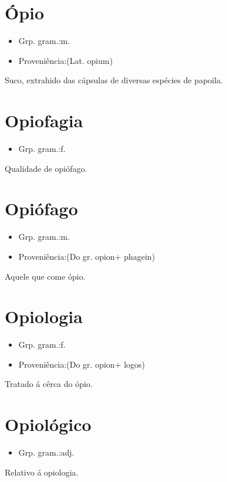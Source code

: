 \section{Ópio}
\begin{itemize}
\item {Grp. gram.:m.}
\end{itemize}
\begin{itemize}
\item {Proveniência:(Lat. \textunderscore opium\textunderscore )}
\end{itemize}
Suco, extrahido das cápsulas de diversas espécies de papoila.
\section{Opiofagia}
\begin{itemize}
\item {Grp. gram.:f.}
\end{itemize}
Qualidade de opiófago.
\section{Opiófago}
\begin{itemize}
\item {Grp. gram.:m.}
\end{itemize}
\begin{itemize}
\item {Proveniência:(Do gr. \textunderscore opion\textunderscore  + \textunderscore phagein\textunderscore )}
\end{itemize}
Aquele que come ópio.
\section{Opiologia}
\begin{itemize}
\item {Grp. gram.:f.}
\end{itemize}
\begin{itemize}
\item {Proveniência:(Do gr. \textunderscore opion\textunderscore  + \textunderscore logos\textunderscore )}
\end{itemize}
Tratado á cêrca do ópio.
\section{Opiológico}
\begin{itemize}
\item {Grp. gram.:adj.}
\end{itemize}
Relativo á opiologia.
